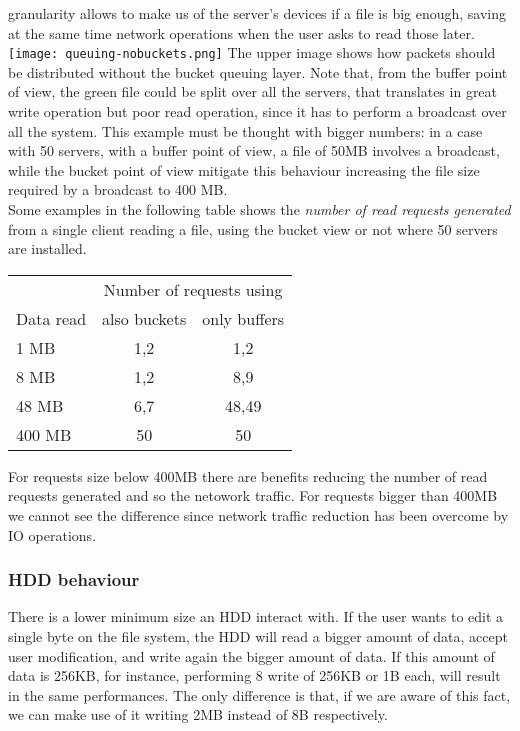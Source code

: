 granularity allows to make us of the server's devices if a file is big enough,
saving at the same time network operations when the user asks to read those
later.\\
\texttt{[image: queuing-nobuckets.png]}
The upper image shows how packets should be distributed without the bucket queuing layer.
Note that, from the buffer point of view, the green file could be
split over all the servers, that translates in great write operation but poor
read operation, since it has to perform a broadcast over all the system. This
example must be thought with bigger numbers: in a case with 50 servers, with a
buffer point of view, a file of 50MB involves a broadcast, while the bucket
point of view mitigate this behaviour increasing the file size required by a
broadcast to 400 MB. \\
Some examples in the following table shows the \textit{number of read requests generated}
from a single client reading a file, using the bucket view or not where 50 servers are installed.

\vspace{0.5cm}
\begin{tabular}{l | c | c}
    & \multicolumn{2}{|c}{Number of requests using} \\
    Data read & also buckets & only buffers \\ \hline
    1 MB & 1,2 & 1,2 \\
    8 MB & 1,2 & 8,9 \\
    48 MB& 6,7 & 48,49 \\
    400 MB & 50 & 50 \\
\end{tabular}
\vspace{0.5cm}

For requests size below 400MB there are benefits reducing the number of read
requests generated and so the netowork traffic. For requests bigger than 400MB
we cannot see the difference since network traffic reduction has been overcome
by IO operations.

\subsubsection*{HDD behaviour}\label{hdd-behaviour}
There is a lower minimum size an HDD interact with. If the user wants to edit a
single byte on the file system, the HDD will read a bigger amount of data,
accept user modification, and write again the bigger amount of data. If this
amount of data is 256KB, for instance, performing 8 write of 256KB or 1B each,
will result in the same performances.  The only difference is that, if we are
aware of this fact, we can make use of it writing 2MB instead of 8B
respectively.

